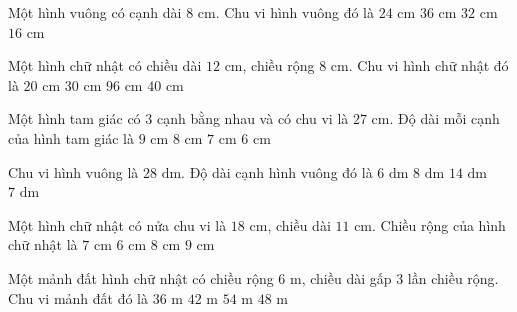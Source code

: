 \begin{ex} %
Một hình vuông có cạnh dài $8\text{ cm}$. Chu vi hình vuông đó là
\choice
{$24\text{ cm}$}
{$36\text{ cm}$}
{\True $32\text{ cm}$}
{$16\text{ cm}$}
\end{ex}

\begin{ex} %
Một hình chữ nhật có chiều dài $12\text{ cm}$, chiều rộng $8\text{ cm}$. Chu vi hình chữ nhật đó là
\choice
{$20\text{ cm}$}
{$30\text{ cm}$}
{$96\text{ cm}$}
{\True $40\text{ cm}$}
\end{ex}

\begin{ex} %
Một hình tam giác có 3 cạnh bằng nhau và có chu vi là $27\text{ cm}$. Độ dài mỗi cạnh của hình tam giác là
\choice
{\True $9\text{ cm}$}
{$8\text{ cm}$}
{$7\text{ cm}$}
{$6\text{ cm}$}
\end{ex}

\begin{ex} %
Chu vi hình vuông là $28\text{ dm}$. Độ dài cạnh hình vuông đó là
\choice
{$6\text{ dm}$}
{$8\text{ dm}$}
{$14\text{ dm}$}
{\True $7\text{ dm}$}
\end{ex}

\begin{ex} %
Một hình chữ nhật có nửa chu vi là $18\text{ cm}$, chiều dài $11\text{ cm}$. Chiều rộng của hình chữ nhật là
\choice
{\True $7\text{ cm}$}
{$6\text{ cm}$}
{$8\text{ cm}$}
{$9\text{ cm}$}
\end{ex}

\begin{ex} %
Một mảnh đất hình chữ nhật có chiều rộng $6\text{ m}$, chiều dài gấp 3 lần chiều rộng. Chu vi mảnh đất đó là
\choice
{$36\text{ m}$}
{$42\text{ m}$}
{$54\text{ m}$}
{\True $48\text{ m}$}
\end{ex}

